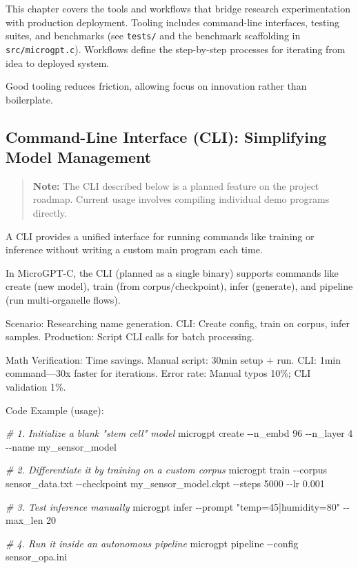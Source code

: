 \documentclass[
]{article}
\newenvironment{Shaded}{}{}
\newcommand{\AttributeTok}[1]{\textcolor[rgb]{0.49,0.56,0.16}{#1}}
\newcommand{\CommentTok}[1]{\textcolor[rgb]{0.38,0.63,0.69}{\textit{#1}}}
\newcommand{\ExtensionTok}[1]{#1}
\newcommand{\NormalTok}[1]{#1}
\newcommand{\StringTok}[1]{\textcolor[rgb]{0.25,0.44,0.63}{#1}}
\begin{document}
This chapter covers the tools and workflows that bridge research
experimentation with production deployment. Tooling includes
command-line interfaces, testing suites, and benchmarks (see
\texttt{tests/} and the benchmark scaffolding in
\texttt{src/microgpt.c}). Workflows define the step-by-step processes
for iterating from idea to deployed system.

Good tooling reduces friction, allowing focus on innovation rather than
boilerplate.

\subsection{Command-Line Interface (CLI): Simplifying Model
Management}\label{command-line-interface-cli-simplifying-model-management}

\begin{quote}
\textbf{Note:} The CLI described below is a planned feature on the
project roadmap. Current usage involves compiling individual demo
programs directly.
\end{quote}

A CLI provides a unified interface for running commands like training or
inference without writing a custom main program each time.

In MicroGPT-C, the CLI (planned as a single binary) supports commands
like create (new model), train (from corpus/checkpoint), infer
(generate), and pipeline (run multi-organelle flows).

Scenario: Researching name generation. CLI: Create config, train on
corpus, infer samples. Production: Script CLI calls for batch
processing.

Math Verification: Time savings. Manual script: 30min setup + run. CLI:
1min command---30x faster for iterations. Error rate: Manual typos 10\%;
CLI validation 1\%.

Code Example (usage):

\begin{Shaded}
\begin{Highlighting}[]
\CommentTok{\# 1. Initialize a blank "stem cell" model}
\ExtensionTok{microgpt}\NormalTok{ create }\AttributeTok{{-}{-}n\_embd}\NormalTok{ 96 }\AttributeTok{{-}{-}n\_layer}\NormalTok{ 4 }\AttributeTok{{-}{-}name}\NormalTok{ my\_sensor\_model}

\CommentTok{\# 2. Differentiate it by training on a custom corpus}
\ExtensionTok{microgpt}\NormalTok{ train }\AttributeTok{{-}{-}corpus}\NormalTok{ sensor\_data.txt }\AttributeTok{{-}{-}checkpoint}\NormalTok{ my\_sensor\_model.ckpt }\AttributeTok{{-}{-}steps}\NormalTok{ 5000 }\AttributeTok{{-}{-}lr}\NormalTok{ 0.001}

\CommentTok{\# 3. Test inference manually}
\ExtensionTok{microgpt}\NormalTok{ infer }\AttributeTok{{-}{-}prompt} \StringTok{"temp=45|humidity=80"} \AttributeTok{{-}{-}max\_len}\NormalTok{ 20}

\CommentTok{\# 4. Run it inside an autonomous pipeline}
\ExtensionTok{microgpt}\NormalTok{ pipeline }\AttributeTok{{-}{-}config}\NormalTok{ sensor\_opa.ini}
\end{Highlighting}
\end{Shaded}
\end{document}
